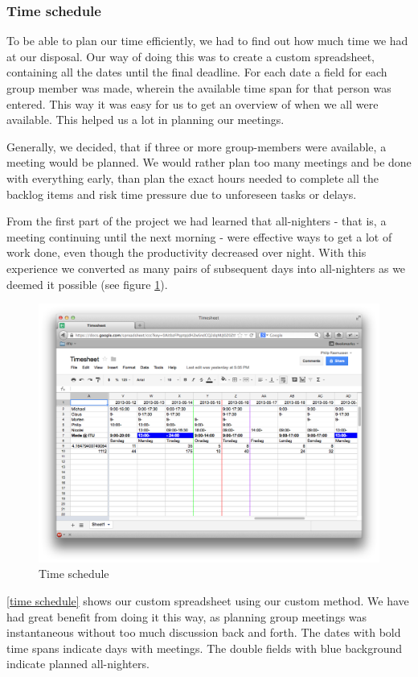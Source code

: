 \subsubsection{Time schedule}
To be able to plan our time efficiently, we had to find out how much time we had at our disposal. Our way of doing this was to create a custom spreadsheet, containing all the dates until the final deadline. For each date a field for each group member was made, wherein the available time span for that person was entered. This way it was easy for us to get an overview of when we all were available. This helped us a lot in planning our meetings.

Generally, we decided, that if three or more group-members were available, a meeting would be planned. We would rather plan too many meetings and be done with everything early, than plan the exact hours needed to complete all the backlog items and risk time pressure due to unforeseen tasks or delays.

From the first part of the project we had learned that all-nighters - that is, a meeting continuing until the next morning - were effective ways to get a lot of work done, even though the productivity decreased over night. With this experience we converted as many pairs of subsequent days into all-nighters as we deemed it possible (see figure \ref{fig:time_schedule}).

\begin{figure}[H]
  \includegraphics[width=\textwidth]{illustrations/partialTimeSheet}
  \caption{Time schedule}
  \label{fig:time_schedule}
\end{figure}

\cref{time schedule} shows our custom spreadsheet using our custom method. We have had great benefit from doing it this way, as planning group meetings was instantaneous without too much discussion back and forth. The dates with bold time spans indicate days with meetings. The double fields with blue background indicate planned all-nighters.